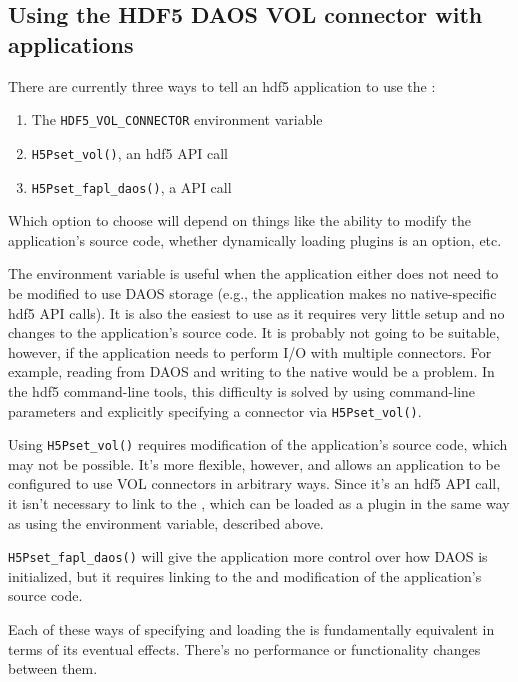 \documentclass[../users_guide.tex]{subfiles}
\begin{document}
\subsection{Using the HDF5 DAOS VOL connector with applications}

There are currently three ways to tell an \acrshort{hdf5} application to use
the \dvc{}: 

\begin{enumerate}
    \item The \texttt{HDF5\_VOL\_CONNECTOR} environment variable
    \item \texttt{H5Pset\_vol()}, an \acrshort{hdf5} API call
    \item \texttt{H5Pset\_fapl\_daos()}, a \dvc{} API call
\end{enumerate}

Which option to choose will depend on things like the ability to modify the
application's source code, whether dynamically loading plugins is an option,
etc.

The environment variable is useful when the application either
does not need to be modified to use DAOS storage (e.g., the application makes
no native-specific \acrshort{hdf5} API calls). It is also the easiest to use
as it requires very little setup and no changes to the application's source
code. It is probably not going to be suitable, however, if the application
needs to perform I/O with multiple connectors. For example, reading from DAOS
and writing to the native \vc{} would be a problem. In the \acrshort{hdf5}
command-line tools, this difficulty is solved by using command-line parameters
and explicitly specifying a connector via \texttt{H5Pset\_vol()}.

Using \texttt{H5Pset\_vol()} requires modification of the application's
source code, which may not be possible. It's more flexible,
however, and allows an application to be configured to use VOL connectors in
arbitrary ways. Since it's an \acrshort{hdf5} API call, it isn't necessary to
link to the \dvc{}, which can be loaded as a plugin in the same way as using
the environment variable, described above.

\texttt{H5Pset\_fapl\_daos()} will give the application more control over how
DAOS is initialized, but it requires linking to the \dvc{} and modification of
the application's source code.

Each of these ways of specifying and loading the \dvc{} is fundamentally
equivalent in terms of its eventual effects. There's no performance or
functionality changes between them.
\end{document}
